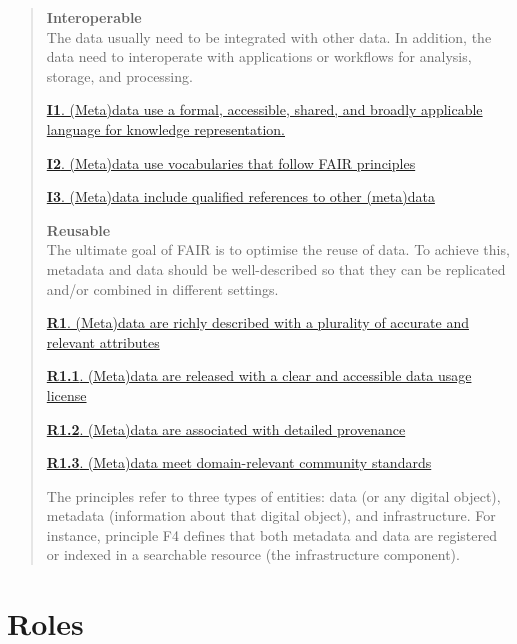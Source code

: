 \documentclass[
]{book}
\begin{document}
\begin{quote}
\textbf{Interoperable}\\
The data usually need to be integrated with other data. In addition, the data need to interoperate with applications or workflows for analysis, storage, and processing.

\href{https://www.go-fair.org/fair-principles/i1-metadata-use-formal-accessible-shared-broadly-applicable-language-knowledge-representation/}{\textbf{I1}. (Meta)data use a formal, accessible, shared, and broadly applicable language for knowledge representation.}

\href{https://www.go-fair.org/fair-principles/i2-metadata-use-vocabularies-follow-fair-principles/}{\textbf{I2}. (Meta)data use vocabularies that follow FAIR principles}

\href{https://www.go-fair.org/fair-principles/i3-metadata-include-qualified-references-metadata/}{\textbf{I3}. (Meta)data include qualified references to other (meta)data}

\textbf{Reusable}\\
The ultimate goal of FAIR is to optimise the reuse of data. To achieve this, metadata and data should be well-described so that they can be replicated and/or combined in different settings.

\href{https://www.go-fair.org/fair-principles/r1-metadata-richly-described-plurality-accurate-relevant-attributes/}{\textbf{R1}. (Meta)data are richly described with a plurality of accurate and relevant attributes}

\href{https://www.go-fair.org/fair-principles/r1-1-metadata-released-clear-accessible-data-usage-license/}{\textbf{R1.1}. (Meta)data are released with a clear and accessible data usage license}

\href{https://www.go-fair.org/fair-principles/r1-2-metadata-associated-detailed-provenance/}{\textbf{R1.2}. (Meta)data are associated with detailed provenance}

\href{https://www.go-fair.org/fair-principles/r1-3-metadata-meet-domain-relevant-community-standards/}{\textbf{R1.3}. (Meta)data meet domain-relevant community standards}

The principles refer to three types of entities: data (or any digital object), metadata (information about that digital object), and infrastructure. For instance, principle F4 defines that both metadata and data are registered or indexed in a searchable resource (the infrastructure component).
\end{quote}

\hypertarget{roles}{%
\section{Roles}\label{roles}}
\end{document}
